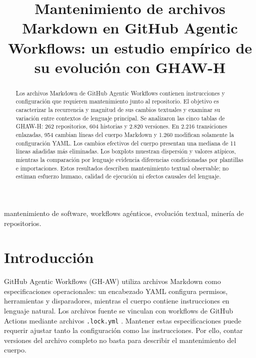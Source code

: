 \documentclass[conference,a4paper]{IEEEtran}
\newcommand{\corr}[1]{{\color{correccion}#1}}
\begin{document}
\title{\corr{Mantenimiento de archivos Markdown en GitHub Agentic Workflows: un estudio empírico de su evolución con GHAW-H}}
\author{
\and
{}
}
\maketitle

\begin{abstract}
\corr{Los archivos Markdown de GitHub Agentic Workflows contienen instrucciones y configuración que requieren mantenimiento junto al repositorio. El objetivo es caracterizar la recurrencia y magnitud de sus cambios textuales y examinar su variación entre contextos de lenguaje principal.}
Se analizaron las cinco tablas de GHAW-H: 262 repositorios, 604 historias y 2.820 versiones. En 2.216 transiciones enlazadas, 954 cambian líneas del cuerpo Markdown y 1.260 modifican solamente la configuración YAML. Los cambios efectivos del cuerpo presentan una mediana de 11 líneas añadidas más eliminadas. Los boxplots muestran dispersión y valores atípicos, mientras la comparación por lenguaje evidencia diferencias condicionadas por plantillas e importaciones. Estos resultados describen mantenimiento textual observable; no estiman esfuerzo humano, calidad de ejecución ni efectos causales del lenguaje.
\end{abstract}
\begin{IEEEkeywords}
mantenimiento de software, workflows agénticos, evolución textual, minería de repositorios.
\end{IEEEkeywords}

\section{Introducción}
\corr{GitHub Agentic Workflows (GH-AW) utiliza archivos Markdown como especificaciones operacionales: un encabezado YAML configura permisos, herramientas y disparadores, mientras el cuerpo contiene instrucciones en lenguaje natural. Los archivos fuente se vinculan con workflows de GitHub Actions mediante archivos \texttt{.lock.yml} \cite{ghawdocs}. Mantener estas especificaciones puede requerir ajustar tanto la configuración como las instrucciones. Por ello, contar versiones del archivo completo no basta para describir el mantenimiento del cuerpo.}
\end{document}

